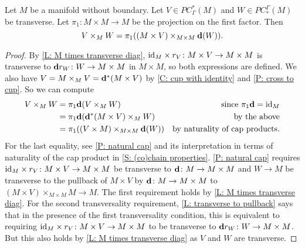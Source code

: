 \begin{lemma}\label{L: diagonal version of intersection}
Let $M$ be a manifold without boundary. Let $V \in PC^*_\Gamma(M)$ and $W \in PC_*^\Gamma(M)$ be transverse. Let $\pi_1 \colon M \times M \to M$ be the projection on the first factor. Then $$V \times_M W = \pi_1((M \times V)\times_{M \times M} \mathbf{d}(W)).$$
\end{lemma}
\begin{proof}
By \cref{L: M times transverse diag}, $\mathrm{id}_M \times r_V \colon M \times V \to M \times M$ is transverse to $\mathbf{d} r_W \colon W \to M \times M$ in $M \times M$, so both expressions are defined. We also have $V = M \times_M V = \mathbf{d}^*(M \times V)$ by \cref{C: cup with identity} and \cref{P: cross to cup}.
So we can compute
\begin{align*}
V \times_M W& = \pi_1\mathbf{d} (V \times_M W)&\text{since $\pi_1\mathbf{d} = \mathrm{id}_M$}\\
& = \pi_1\mathbf{d} (\mathbf{d}^*(M \times V) \times_M W)&\text{by the above}\\
& = \pi_1((V \times M)\times_{M \times M}\mathbf{d}(W))&\text{by naturality of cap products.}
\end{align*}
For the last equality, see \cref{P: natural cap} and its interpretation in terms of naturality of the cap product in \cref{S: (co)chain properties}. \cref{P: natural cap} requires $\mathrm{id}_M \times r_V \colon M \times V \to M \times M$ be transverse to $\mathbf{d} \colon M \to M \times M$ and $W \to M$ be transverse to the pullback of $M \times V$ by $\mathbf{d} \colon M \to M \times M$ to
$(M \times V)\times_{M \times M}M \to M$.
The first requirement holds by \cref{L: M times transverse diag}. For the second transversality requirement, \cref{L: transverse to pullback} says that in the presence of the first transversality condition, this is equivalent to requiring $\mathrm{id}_M \times r_V \colon M \times V \to M \times M$ to be transverse to $\mathbf{d} r_W \colon W \to M \times M$. But this also holds by \cref{L: M times transverse diag} as $V$ and $W$ are transverse.
\end{proof}


